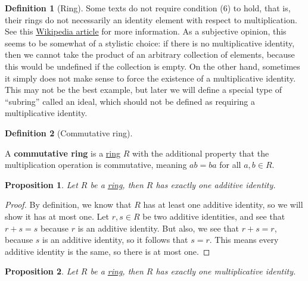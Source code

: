 \documentclass{scrartcl}
\theoremstyle{definition}
\newtheorem{definition}{Definition}[section]
\theoremstyle{plain}
\newtheorem{proposition}{Proposition}[section]
\begin{document}
\begin{definition}[Ring]
    Some texts do not require condition (6) to hold, that is, their rings do not necessarily an identity element with
    respect to multiplication.
    See this \href{https://en.wikipedia.org/wiki/Ring_(mathematics)#Notes_on_the_definition}{Wikipedia article} for
    more information.
    As a subjective opinion, this seems to be somewhat of a stylistic choice: if there is no multiplicative identity,
    then we cannot take the product of an arbitrary collection of elements, because this would be undefined if the
    collection is empty.
    On the other hand, sometimes it simply does not make sense to force the existence of a multiplicative identity.
    This may not be the best example, but later we will define a special type of ``subring'' called an ideal, which
    should not be defined as requiring a multiplicative identity.
\end{definition}

\begin{definition}[Commutative ring]
    \label{def:commutative ring}

    A \textbf{commutative ring} is a \hyperref[def:ring]{ring} $R$ with the additional property that the multiplication
    operation is commutative, meaning $ab=ba$ for all $a,b\in R$.
\end{definition}

\begin{proposition}
    \label{prop:unique additive identity}
    Let $R$ be a \hyperref[def:ring]{ring}, then $R$ has exactly one additive identity.
\end{proposition}

\begin{proof}
    By definition, we know that $R$ has at least one additive identity, so we will show it has at most one.
    Let $r,s\in R$ be two additive identities, and see that $r+s=s$ because $r$ is an additive identity.
    But also, we see that $r+s=r$, because $s$ is an additive identity, so it follows that $s=r$.
    This means every additive identity is the same, so there is at most one.
\end{proof}

\begin{proposition}
    \label{prop:unique multiplicative identity}
    Let $R$ be a \hyperref[def:ring]{ring}, then $R$ has exactly one multiplicative identity.
\end{proposition}
\end{document}
